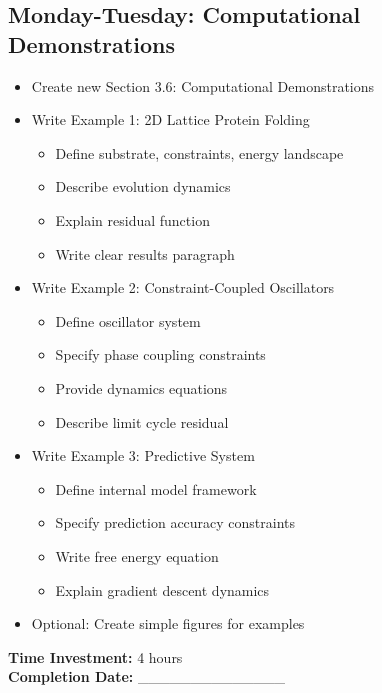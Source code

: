 \documentclass[11pt]{article}
\begin{document}
\subsection*{Monday-Tuesday: Computational Demonstrations}
\begin{itemize}[label=$\square$]
    \item Create new Section 3.6: Computational Demonstrations
    \item Write Example 1: 2D Lattice Protein Folding
    \begin{itemize}[label=$\circ$]
        \item Define substrate, constraints, energy landscape
        \item Describe evolution dynamics
        \item Explain residual function
        \item Write clear results paragraph
    \end{itemize}
    \item Write Example 2: Constraint-Coupled Oscillators
    \begin{itemize}[label=$\circ$]
        \item Define oscillator system
        \item Specify phase coupling constraints
        \item Provide dynamics equations
        \item Describe limit cycle residual
    \end{itemize}
    \item Write Example 3: Predictive System
    \begin{itemize}[label=$\circ$]
        \item Define internal model framework
        \item Specify prediction accuracy constraints
        \item Write free energy equation
        \item Explain gradient descent dynamics
    \end{itemize}
    \item Optional: Create simple figures for examples
\end{itemize}

\textbf{Time Investment:} 4 hours\\
\textbf{Completion Date:} \_\_\_\_\_\_\_\_\_\_\_\_\_\_
\end{document}
